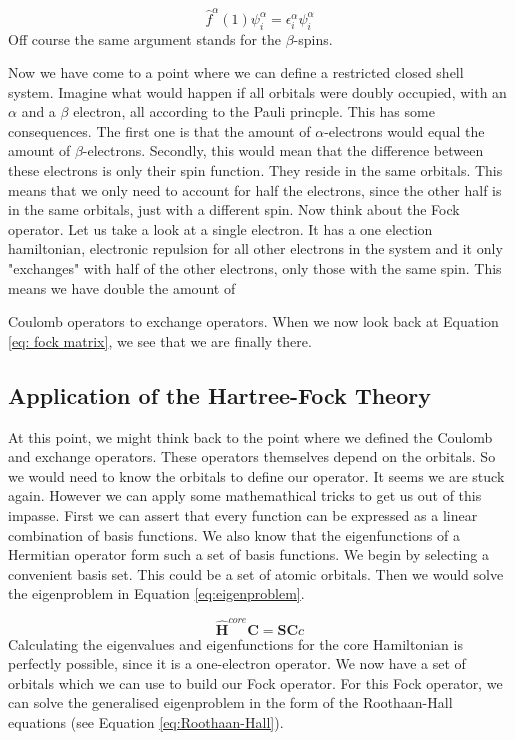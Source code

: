 \begin{equation}\label{eq:spinelim}
    \hat{f}^{\alpha}(1)\psi^{\alpha}_i = \epsilon^{\alpha}_i\psi^{\alpha}_i
\end{equation}
Off course the same argument stands for the $\beta$-spins.

Now we have come to a point where we can define a restricted closed shell system.
Imagine what would happen if all orbitals were doubly occupied, with an $\alpha$
and a $\beta$ electron, all according to the Pauli princple. This has some consequences.
The first one is that the amount of $\alpha$-electrons would equal the amount of
$\beta$-electrons. Secondly, this would mean that the difference between these electrons
is only their spin function. They reside in the same orbitals. This means that we only
need to account for half the electrons, since the other half is in the same orbitals,
just with a different spin. Now think about the Fock operator. Let us
take a look at a single electron. It has a one election hamiltonian, electronic repulsion
for all other electrons in the system and it only "exchanges" with half of the other
electrons, only those with the same spin. This means we have double the amount of 

Coulomb operators to exchange operators. When we now look back at Equation \ref{eq: fock matrix},
we see that we are finally there.

\subsection{Application of the Hartree-Fock Theory}
\label{subsec:applic}
At this point, we might think back to the point where we defined the Coulomb and
exchange operators. These operators themselves depend on the orbitals. So we would
need to know the orbitals to define our operator. It seems we are stuck again.
However we can apply some mathemathical tricks to get us out of this impasse. 
First we can assert that every function can be expressed as a linear combination
of basis functions. We also know that the eigenfunctions of a Hermitian operator
form such a set of basis functions. We begin by selecting a convenient basis set.
This could be a set of atomic orbitals. Then we would solve the eigenproblem in
Equation \ref{eq:eigenproblem}.

\begin{equation}\label{eq:eigenproblem}
    \boldsymbol{\hat{H}}^{core}\boldsymbol{C} = \boldsymbol{SC}c
\end{equation} 
Calculating the eigenvalues and eigenfunctions for the core Hamiltonian is 
perfectly possible, since it is a one-electron operator. We now have a set of 
orbitals which we can use to build our Fock operator. For this Fock operator, 
we can solve the generalised eigenproblem in the form of the Roothaan-Hall 
equations (see Equation \ref{eq:Roothaan-Hall}).

